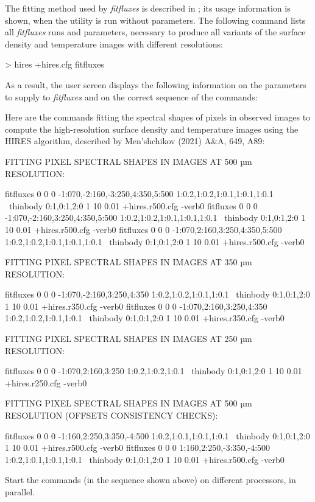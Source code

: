\documentclass[a4paper,10pt]{article}
\begin{document}
The fitting method used by \textsl{fitfluxes} is described in \cite{Men'shchikov2016}; its usage information is shown, when the
utility is run without parameters. The following command lists all \textsl{fitfluxes} runs and parameters, necessary to produce all
variants of the surface density and temperature images with different resolutions:
\begin{verbnobox}[\mbox{}\small]
> hires +hires.cfg fitfluxes
\end{verbnobox}
As a result, the user screen displays the following information on the parameters to supply to \textsl{fitfluxes} and on the
correct sequence of the commands:
\begin{verbnobox}[\mbox{}\small]
 Here are the commands fitting the spectral shapes of pixels in observed images
 to compute the high-resolution surface density and temperature images using the
 HIRES algorithm, described by Men’shchikov (2021) A&A, 649, A89:
 
 FITTING PIXEL SPECTRAL SHAPES IN IMAGES AT 500 µm RESOLUTION:

 fitfluxes 0 0 0 -1:070,-2:160,-3:250,4:350,5:500 1:0.2,1:0.2,1:0.1,1:0.1,1:0.1 \
           thinbody 0:1,0:1,2:0 1 10 0.01 +hires.r500.cfg -verb0
 fitfluxes 0 0 0 -1:070,-2:160,3:250,4:350,5:500 1:0.2,1:0.2,1:0.1,1:0.1,1:0.1 \
           thinbody 0:1,0:1,2:0 1 10 0.01 +hires.r500.cfg -verb0
 fitfluxes 0 0 0 -1:070,2:160,3:250,4:350,5:500 1:0.2,1:0.2,1:0.1,1:0.1,1:0.1 \
           thinbody 0:1,0:1,2:0 1 10 0.01 +hires.r500.cfg -verb0

 FITTING PIXEL SPECTRAL SHAPES IN IMAGES AT 350 µm RESOLUTION:

 fitfluxes 0 0 0 -1:070,-2:160,3:250,4:350 1:0.2,1:0.2,1:0.1,1:0.1 \
           thinbody 0:1,0:1,2:0 1 10 0.01 +hires.r350.cfg -verb0
 fitfluxes 0 0 0 -1:070,2:160,3:250,4:350 1:0.2,1:0.2,1:0.1,1:0.1 \
           thinbody 0:1,0:1,2:0 1 10 0.01 +hires.r350.cfg -verb0

 FITTING PIXEL SPECTRAL SHAPES IN IMAGES AT 250 µm RESOLUTION:

 fitfluxes 0 0 0 -1:070,2:160,3:250 1:0.2,1:0.2,1:0.1 \
           thinbody 0:1,0:1,2:0 1 10 0.01 +hires.r250.cfg -verb0

 FITTING PIXEL SPECTRAL SHAPES IN IMAGES AT 500 µm RESOLUTION (OFFSETS CONSISTENCY CHECKS):

 fitfluxes 0 0 0 -1:160,2:250,3:350,-4:500 1:0.2,1:0.1,1:0.1,1:0.1 \
           thinbody 0:1,0:1,2:0 1 10 0.01 +hires.r500.cfg -verb0
 fitfluxes 0 0 0 1:160,2:250,-3:350,-4:500 1:0.2,1:0.1,1:0.1,1:0.1 \
           thinbody 0:1,0:1,2:0 1 10 0.01 +hires.r500.cfg -verb0

 Start the commands (in the sequence shown above) on different processors, in parallel.
\end{verbnobox}
\end{document}
